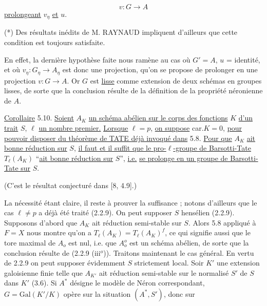 \begin{equation*}
v : G \longrightarrow A
\end{equation*}
\underline{prolongeant} $v_\eta$ \underline{et} $u$.

(*) Des résultats inédits de M. RAYNAUD impliquent d'ailleurs que cette condition est toujours satisfaite.



En effet, la dernière hypothèse faite nous ramène au cas où $G'=A$, $u$ = identité, et où $v_\eta : G_\eta \longrightarrow A_\eta$ est donc une projection, qu'on se propose de prolonger en une projection $v: G \longrightarrow A$. Or $G$ est \underline{lisse} comme extension de deux schémas en groupes lisses, de sorte que la conclusion résulte de la définition de la propriété néronienne de $A$.

\underline{Corollaire} 5.10. \underline{Soient} $A_K$ \underline{un schéma abélien sur le corps des fonctions} $K$ \underline{d'un trait} $S$, $\ell$ \underline{un nombre premier.} \underline{Lorsque} $\ell = p$, \underline{on suppose} car.$K = 0$, \underline{pour pouvoir disposer du théorème de TATE déjà invoqué dans} 5.8. \underline{Pour que} $A_K$ \underline{ait bonne réduction sur} $S$, \underline{il faut et il suffit que le pro-$\ell$-groupe de Barsotti-Tate} $T_\ell(A_K)$ ``\underline{ait bonne réduction sur} $S$'', \underline{i.e.} \underline{se prolonge en un groupe de Barsotti-Tate sur} $S$.

(C'est le résultat conjecturé dans [8, 4.9].)

La nécessité étant claire, il reste à prouver la suffisance ; notons d'ailleurs que le cas $\ell \neq p$ a déjà été traité (2.2.9). On peut supposer $S$ hensélien (2.2.9). Supposons d'abord que $A_K$ ait réduction semi-stable sur $S$. Alors 5.8 appliqué à $F = X$ nous montre qu'on a $T_\ell(A_K) = T_\ell(A_K)^f$, ce qui signifie aussi que le tore maximal de $A_o$ est nul, i.e. que $A_o^o$ est un schéma abélien, de sorte que la conclusion résulte de (2.2.9 (iii${}^o$)). Traitons maintenant le cas général. En vertu de 2.2.9 on peut supposer évidemment $S$ strictement local. Soir $K'$ une extension galoisienne finie telle que $A_{K'}$ ait réduction semi-stable sur le normalisé $S'$ de $S$ dans $K'$ (3.6). Si $A^*$ désigne le modèle de Néron correspondant, $G = \mathrm{Gal}(K'/K)$ opère sur la situation $(A^*,S')$, donc sur



